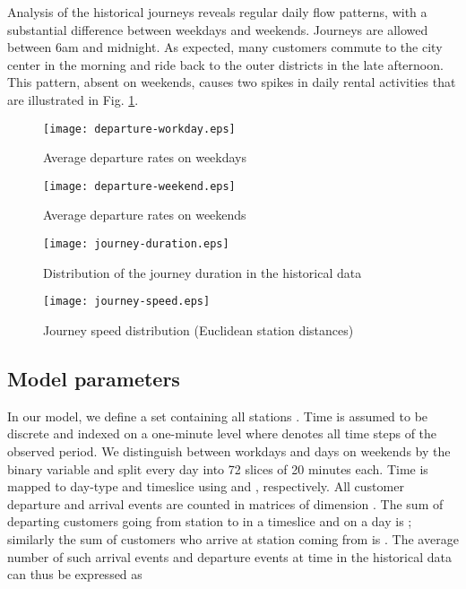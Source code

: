 \documentclass{article}
\begin{document}
Analysis of the historical journeys reveals regular daily flow patterns, with a
substantial difference between weekdays and weekends. Journeys are allowed
between 6am and midnight. As expected, many customers commute to the city center
in the morning and ride back to the outer districts in the late afternoon. This
pattern, absent on weekends, causes two spikes in daily rental activities that
are illustrated in Fig. \ref{fig:daily-rides}.
\begin{subfigures}
  \begin{figure}
    \begin{minipage}[h]{.475\linewidth}
      \centering
      \texttt{[image: departure-workday.eps]}
      \caption{Average departure rates on weekdays}
      \label{fig:rides-workday}
    \end{minipage}
    \hfill
    \begin{minipage}[h]{.475\linewidth}
      \centering
      \texttt{[image: departure-weekend.eps]}
      \caption{Average departure rates on weekends}
      \label{fig:rides-weekend}
    \end{minipage}
    \label{fig:daily-rides}
  \end{figure}
\end{subfigures}

\begin{subfigures}
  \begin{figure}
    \begin{minipage}[h]{.475\linewidth}
      \centering
      \texttt{[image: journey-duration.eps]}
      \caption{Distribution of the journey duration in the historical data}
      \label{fig:journey-duration}
    \end{minipage}
    \hfill
    \begin{minipage}[h]{.475\linewidth}
      \centering
      \texttt{[image: journey-speed.eps]}
      \caption{Journey speed distribution (Euclidean station distances)}
\label{fig:journey-speed}
    \end{minipage}
    \label{fig:journey-figures}
  \end{figure}
\end{subfigures}

\subsection{Model parameters}

In our model, we define a set  containing all stations . Time  is
assumed to be discrete and indexed on a one-minute level where  denotes all
time steps of the observed period. We distinguish between workdays and days on
weekends by the binary variable  and split every day
into 72 slices  of 20 minutes each.
Time is mapped to day-type and timeslice using  and , respectively.
All customer departure and arrival events are counted in matrices of dimension
. The sum of departing customers going from station  to  in
a timeslice  and on a day  is ; similarly the sum of
customers who arrive at station  coming from  is . The
average number of such arrival events  and departure events
 at time  in the historical data can thus be expressed as
\end{document}

